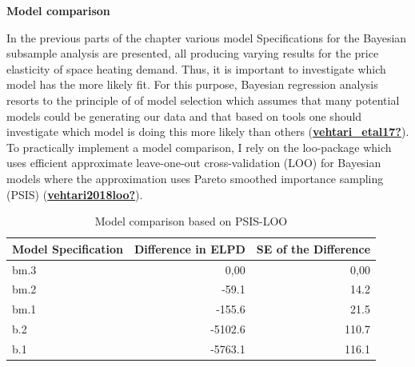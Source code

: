 \documentclass[12pt,twoside]{reedthesis}
\begin{document}
\textbf{Model comparison}

In the previous parts of the chapter various model Specifications for the Bayesian subsample analysis are presented, all producing varying results for the price elasticity of space heating demand. Thus, it is important to investigate which model has the more likely fit. For this purpose, Bayesian regression analysis resorts to the principle of of model selection which assumes that many potential models could be generating our data and that based on tools one should investigate which model is doing this more likely than others (\protect\hyperlink{ref-vehtari_etal17}{\textbf{vehtari\_etal17?}}). To practically implement a model comparison, I rely on the loo-package which uses efficient approximate leave-one-out cross-validation (LOO) for Bayesian models where the approximation uses Pareto smoothed importance sampling (PSIS) (\protect\hyperlink{ref-vehtari2018loo}{\textbf{vehtari2018loo?}}).
\begin{table}[]
\centering
\caption{Model comparison based on PSIS-LOO}
\label{tab:model-comparison}
\begin{tabular}{@{}lrr@{}}
\toprule
\textbf{Model Specification} & \multicolumn{1}{l}{\textbf{Difference in ELPD}} & \multicolumn{1}{l}{\textbf{SE of the Difference}} \\ \midrule
bm.3 & 0,00 & 0,00 \\
bm.2 & -59.1 & 14.2 \\
bm.1 & -155.6 & 21.5 \\
b.2 & -5102.6 & 110.7 \\
b.1 & -5763.1 & 116.1 \\ \bottomrule
\end{tabular}
\end{table}
\par
\end{document}
